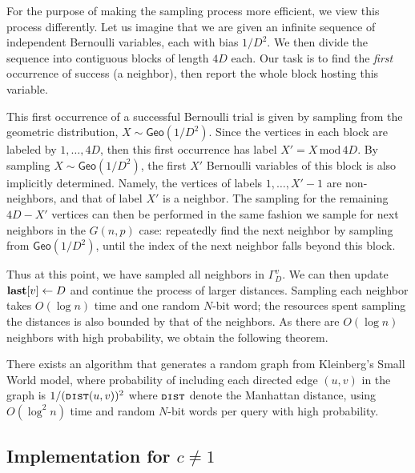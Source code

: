 For the purpose of making the sampling process more efficient, we view this process differently. Let us imagine that we are given an infinite sequence of independent Bernoulli variables, each with bias $1/D^2$.
We then divide the sequence into contiguous blocks of length $4D$ each.
Our task is to find the \emph{first} occurrence of success (a neighbor), then report the whole block hosting this variable.

This first occurrence of a successful Bernoulli trial is given by sampling from the geometric distribution, $X\sim\mathsf{Geo}(1/D^2)$.
Since the vertices in each block are labeled by $1, \ldots, 4D$, then this first occurrence has label $X' = {X\mathrm{\,mod\,}4D}$.
By sampling $X\sim\mathsf{Geo}(1/D^2)$, the first $X'$ Bernoulli variables of this block is also implicitly determined. Namely, the vertices of labels $1, \ldots, X'-1$ are non-neighbors, and that of label $X'$ is a neighbor.
The sampling for the remaining $4D-X'$ vertices can then be performed in the same fashion we sample for next neighbors in the $G(n,p)$ case: 
repeatedly find the next neighbor by sampling from $\mathsf{Geo}(1/D^2)$, until the index of the next neighbor falls beyond this block.

Thus at this point, we have sampled all neighbors in $\Gamma_D^v$. We can then update $\mathbf{last}[v] \leftarrow D$ and continue the process of larger distances.
Sampling each neighbor takes $O(\log n)$ time and one random $N$-bit word; the resources spent sampling the distances is also bounded by that of the neighbors.
As there are $O(\log n)$ neighbors with high probability, we obtain the following theorem.

\begin{theorem}\label{thm-swm} 
There exists an algorithm that generates a random graph from Kleinberg's Small World model,
where probability of including each directed edge $(u,v)$ in the graph is $1/(\texttt{\textsc{dist}}(u,v))^2$ where $\texttt{\textsc{dist}}$ denote the Manhattan distance,
using $O(\log^2 n)$ time and random $N$-bit words per  query with high probability.
\end{theorem}

\subsection{Implementation for $c \neq 1$}

